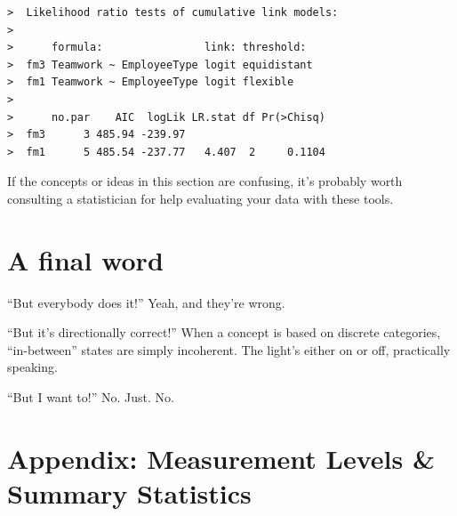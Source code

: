 \documentclass[]{book}
\begin{document}
\begin{verbatim}
>  Likelihood ratio tests of cumulative link models:
>   
>      formula:                link: threshold: 
>  fm3 Teamwork ~ EmployeeType logit equidistant
>  fm1 Teamwork ~ EmployeeType logit flexible   
>  
>      no.par    AIC  logLik LR.stat df Pr(>Chisq)
>  fm3      3 485.94 -239.97                      
>  fm1      5 485.54 -237.77   4.407  2     0.1104
\end{verbatim}

If the concepts or ideas in this section are confusing, it's probably
worth consulting a statistician for help evaluating your data with these
tools.

\chapter{A final word}\label{a-final-word}

``But everybody does it!'' Yeah, and they're wrong.

``But it's directionally correct!'' When a concept is based on discrete
categories, ``in-between'' states are simply incoherent. The light's
either on or off, practically speaking.

``But I want to!'' No. Just. No.

\chapter*{Appendix: Measurement Levels \& Summary
Statistics}\label{appendix-measurement-levels-summary-statistics}
\end{document}
